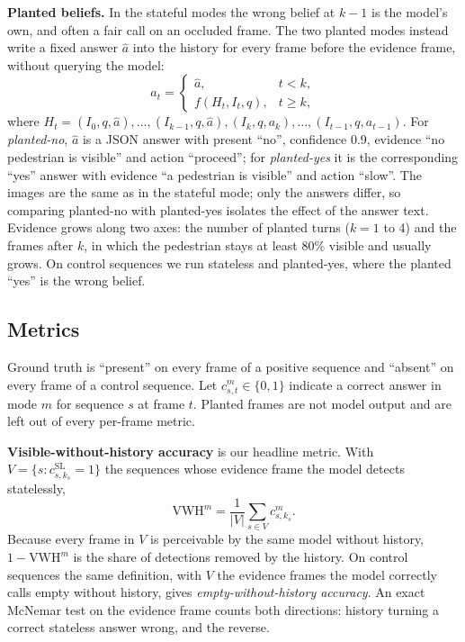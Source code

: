 \documentclass[conference]{IEEEtran}
\begin{document}
\textbf{Planted beliefs.} In the stateful modes the wrong belief at $k-1$ is the model's own, and often a fair call on an occluded frame. The two planted modes instead write a fixed answer $\hat a$ into the history for every frame before the evidence frame, without querying the model:
\begin{equation}
a_t = \begin{cases} \hat a, & t < k,\\ f(H_t, I_t, q), & t \ge k, \end{cases}
\end{equation}
where $H_t = (I_0,q,\hat a),\dots,(I_{k-1},q,\hat a),(I_k,q,a_k),\dots,(I_{t-1},q,a_{t-1})$. For \emph{planted-no}, $\hat a$ is a JSON answer with present ``no'', confidence 0.9, evidence ``no pedestrian is visible'' and action ``proceed''; for \emph{planted-yes} it is the corresponding ``yes'' answer with evidence ``a pedestrian is visible'' and action ``slow''. The images are the same as in the stateful mode; only the answers differ, so comparing planted-no with planted-yes isolates the effect of the answer text. Evidence grows along two axes: the number of planted turns ($k=1$ to 4) and the frames after $k$, in which the pedestrian stays at least 80\% visible and usually grows. On control sequences we run stateless and planted-yes, where the planted ``yes'' is the wrong belief.

\subsection{Metrics}

Ground truth is ``present'' on every frame of a positive sequence and ``absent'' on every frame of a control sequence. Let $c^m_{s,t}\in\{0,1\}$ indicate a correct answer in mode $m$ for sequence $s$ at frame $t$. Planted frames are not model output and are left out of every per-frame metric.

\textbf{Visible-without-history accuracy} is our headline metric. With $V=\{s : c^{\text{SL}}_{s,k_s}=1\}$ the sequences whose evidence frame the model detects statelessly,
\begin{equation}
\text{VWH}^m = \frac{1}{|V|}\sum_{s\in V} c^m_{s,k_s}.
\end{equation}
Because every frame in $V$ is perceivable by the same model without history, $1-\text{VWH}^m$ is the share of detections removed by the history. On control sequences the same definition, with $V$ the evidence frames the model correctly calls empty without history, gives \emph{empty-without-history accuracy}. An exact McNemar test on the evidence frame counts both directions: history turning a correct stateless answer wrong, and the reverse.
\end{document}
